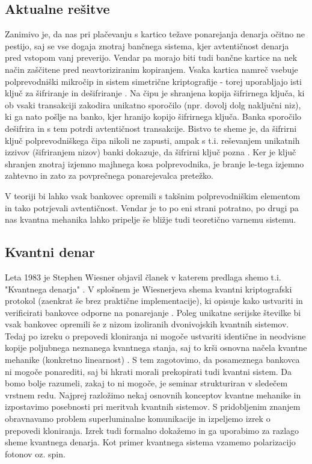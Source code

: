 \documentclass[12pt]{article}
\begin{document}
\subsection{Aktualne rešitve}
	
\par Zanimivo je, da nas pri plačevanju s kartico težave ponarejanja denarja očitno ne pestijo, saj se vse dogaja znotraj bančnega sistema, kjer avtentičnost denarja pred vstopom vanj preverijo. Vendar pa morajo biti tudi bančne kartice na nek način zaščitene pred neavtoriziranim kopiranjem. Vsaka kartica namreč vsebuje polprevodniški mikročip in sistem simetrične kriptografije - torej uporabljajo isti ključ za šifriranje in dešifriranje \cite{CS101IntroductionComputing}. Na čipu je shranjena kopija šifrirnega ključa, ki ob vsaki transakciji zakodira unikatno sporočilo (npr. dovolj dolg naključni niz), ki ga nato pošlje na banko, kjer hranijo kopijo šifrirnega ključa. Banka sporočilo dešifrira in s tem potrdi avtentičnost transakcije. Bistvo te sheme je, da šifrirni ključ polprevodniškega čipa nikoli ne zapusti, ampak s t.i. reševanjem unikatnih izzivov (šifriranjem nizov) banki dokazuje, da šifrirni ključ pozna \cite{CS101IntroductionComputing}. Ker je ključ shranjen znotraj izjemno majhnega kosa polprevodnika, je branje le-tega izjemno zahtevno \cite{christopheDescramblingDataReading2006} in zato za povprečnega ponarejevalca pretežko.
\par
V teoriji bi lahko vsak bankovec opremili s takšnim polprevodniškim elementom in tako potrjevali avtentičnost. Vendar je to po eni strani potratno, po drugi pa nas kvantna mehanika lahko pripelje še bližje tudi teoretično varnemu sistemu. 

\subsection{Kvantni denar}

Leta 1983 je Stephen Wiesner objavil članek v katerem predlaga shemo t.i. "Kvantnega denarja" \cite{wiesnerConjugateCoding1983}. V splošnem je Wiesnerjeva shema kvantni kriptografski protokol (zaenkrat še brez praktične implementacije), ki opisuje kako ustvariti in verificirati bankovce odporne na ponarejanje \cite{QuantumMoney2022}. Poleg unikatne serijske številke bi vsak bankovec opremili še z nizom izoliranih dvonivojskih kvantnih sistemov. Tedaj po izreku o prepovedi kloniranja ni mogoče ustvariti identične in neodvisne kopije poljubnega neznanega kvantnega stanja, saj to krši osnovna načela kvantne mehanike (konkretno linearnost) \cite{NocloningTheorem2022}. S tem zagotovimo, da posameznega bankovca ni mogoče ponarediti, saj bi hkrati morali prekopirati tudi kvantni sistem. Da bomo bolje razumeli, zakaj to ni mogoče, je seminar strukturiran v sledečem vrstnem redu. Najprej razložimo nekaj osnovnih konceptov kvantne mehanike in izpostavimo posebnosti pri meritvah kvantnih sistemov. S pridobljenim znanjem obravnavamo problem superluminalne komunikacije in izpeljemo izrek o prepovedi kloniranja. Izrek tudi formalno dokažemo in ga uporabimo za razlago sheme kvantnega denarja. Kot primer kvantnega sistema vzamemo polarizacijo fotonov oz. spin.  
\end{document}
